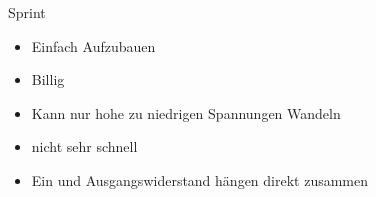 
\begin{frame}[c]{Sprint}

  \begin{itemize}
    \item Einfach Aufzubauen
    \item Billig
    \item Kann nur hohe zu niedrigen Spannungen Wandeln
    \item nicht sehr schnell
    \item Ein und Ausgangswiderstand hängen direkt zusammen
  \end{itemize}

\end{frame}

